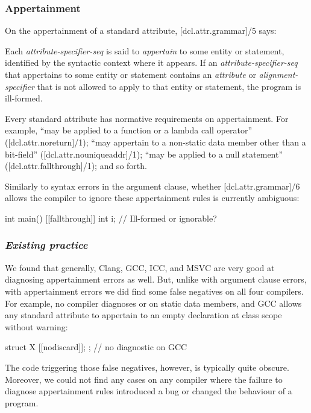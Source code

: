 \subsubsection{Appertainment}
\label{subsubsec:appertainment}

On the appertainment of a standard attribute, [dcl.attr.grammar]/5 says:

\begin{adjustwidth}{0.5cm}{0.5cm}
Each \emph{attribute-specifier-seq} is said to \emph{appertain} to some entity or statement, identified by the syntactic context where it appears. If an \emph{attribute-specifier-seq} that appertains to some entity or statement contains an \emph{attribute} or \emph{alignment-specifier} that is not allowed to apply to that entity or statement, the program is ill-formed.
\end{adjustwidth}

Every standard attribute has normative requirements on appertainment. For example,  ``may be applied to a function or a lambda call operator'' ([dcl.attr.noreturn]/1); \mbox{} ``may appertain to a non-static data member other than a bit-field'' ([dcl.attr.nouniqueaddr]/1);  ``may be applied to a null statement'' ([dcl.attr.fallthrough]/1); and so forth.

Similarly to syntax errors in the argument clause, whether [dcl.attr.grammar]/6 allows the compiler to ignore these appertainment rules is currently ambiguous:

\begin{codeblock}
int main() {
  [[fallthrough]] int i;  // Ill-formed or ignorable?
}
\end{codeblock}

\subsubsection*{\emph{Existing practice}}

We found that generally, Clang, GCC, ICC, and MSVC are very good at diagnosing appertainment errors as well. But, unlike with argument clause errors, with appertainment errors we did find some false negatives on all four compilers. For example, no compiler diagnoses \tcode{[[deprecated]]} or  on static data members, and GCC allows any standard attribute to appertain to an empty declaration at class scope without warning:
\begin{codeblock}
struct X { [[nodiscard]]; };  // no diagnostic on GCC
\end{codeblock}
The code triggering those false negatives, however, is typically quite obscure. Moreover, we could not find any cases on any compiler where the failure to diagnose appertainment rules introduced a bug or changed the behaviour of a program.

